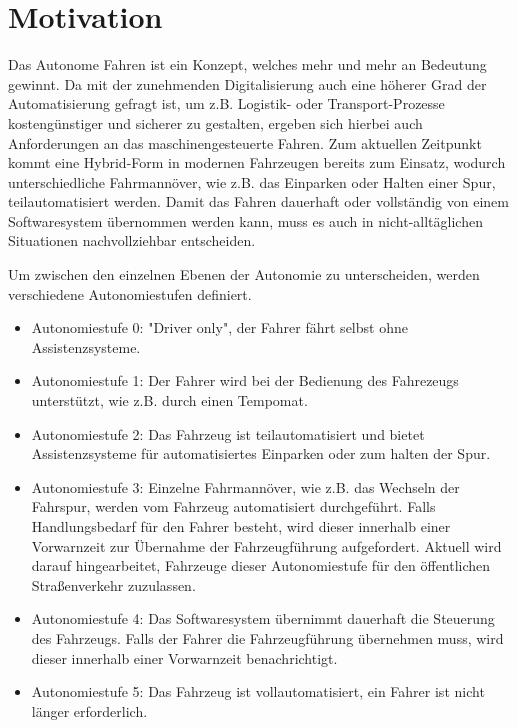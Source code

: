 \section{Motivation}
Das Autonome Fahren ist ein Konzept, welches mehr und mehr an Bedeutung gewinnt. Da mit der zunehmenden
Digitalisierung auch eine höherer Grad der Automatisierung gefragt ist, um z.B. Logistik- oder Transport-Prozesse 
kostengünstiger und sicherer zu gestalten, ergeben sich hierbei auch Anforderungen an das maschinengesteuerte Fahren.
Zum aktuellen Zeitpunkt kommt eine Hybrid-Form in modernen Fahrzeugen bereits zum Einsatz, wodurch unterschiedliche 
Fahrmannöver, wie z.B. das Einparken oder Halten einer Spur, teilautomatisiert werden. Damit das Fahren dauerhaft oder
vollständig von einem Softwaresystem übernommen werden kann, muss es auch in nicht-alltäglichen Situationen nachvollziehbar
entscheiden.

Um zwischen den einzelnen Ebenen der Autonomie zu unterscheiden, werden verschiedene Autonomiestufen definiert.
\begin{itemize}
    \item Autonomiestufe 0: "Driver only", der Fahrer fährt selbst ohne Assistenzsysteme.
    \item Autonomiestufe 1: Der Fahrer wird bei der Bedienung des Fahrezeugs unterstützt, wie z.B. durch einen Tempomat.
    \item Autonomiestufe 2: Das Fahrzeug ist teilautomatisiert und bietet Assistenzsysteme für automatisiertes Einparken 
                            oder zum halten der Spur.
    \item Autonomiestufe 3: Einzelne Fahrmannöver, wie z.B. das Wechseln der Fahrspur, werden vom Fahrzeug automatisiert durchgeführt.
                            Falls Handlungsbedarf für den Fahrer besteht, wird dieser innerhalb einer Vorwarnzeit zur Übernahme
                            der Fahrzeugführung aufgefordert. Aktuell wird darauf hingearbeitet, Fahrzeuge dieser Autonomiestufe
                            für den öffentlichen Straßenverkehr zuzulassen.
    \item Autonomiestufe 4: Das Softwaresystem übernimmt dauerhaft die Steuerung des Fahrzeugs. Falls der Fahrer die Fahrzeugführung
                            übernehmen muss, wird dieser innerhalb einer Vorwarnzeit benachrichtigt.
    \item Autonomiestufe 5: Das Fahrzeug ist vollautomatisiert, ein Fahrer ist nicht länger erforderlich. \cite{BASt}
\end{itemize}

